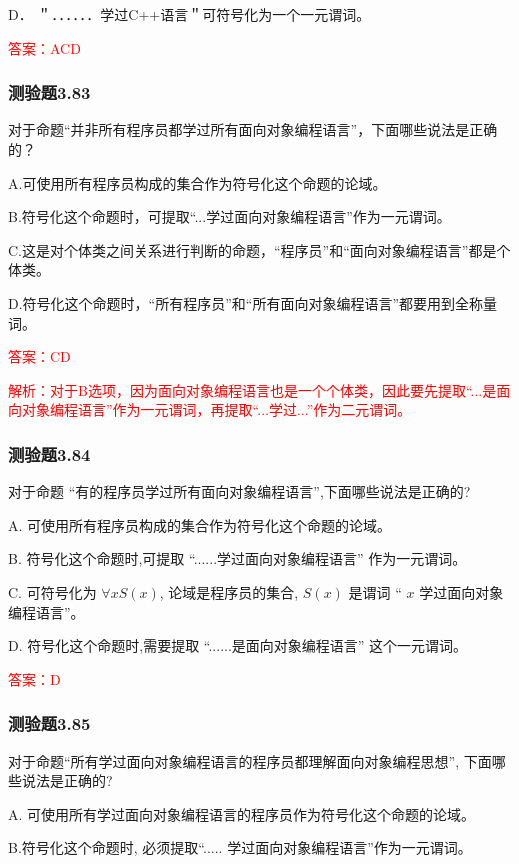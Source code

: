 \documentclass[UTF8, heading=true]{ctexart}
\begin{document}
D．
＂．．．．．．学过C++语言＂可符号化为一个一元谓词。

\textcolor{red}{答案：ACD}

\subsubsection{测验题3.83}

对于命题“并非所有程序员都学过所有面向对象编程语言”，下面哪些说法是正确的？

A.可使用所有程序员构成的集合作为符号化这个命题的论域。

B.符号化这个命题时，可提取“...学过面向对象编程语言”作为一元谓词。

C.这是对个体类之间关系进行判断的命题，“程序员”和“面向对象编程语言”都是个体类。

D.符号化这个命题时，“所有程序员”和“所有面向对象编程语言”都要用到全称量词。

\textcolor{red}{答案：CD}

\textcolor{red}{解析：对于B选项，因为面向对象编程语言也是一个个体类，因此要先提取“...是面向对象编程语言”作为一元谓词，再提取“...学过...”作为二元谓词。}

\subsubsection{测验题3.84}

对于命题 “有的程序员学过所有面向对象编程语言”,下面哪些说法是正确的?

A. 可使用所有程序员构成的集合作为符号化这个命题的论域。

B.  符号化这个命题时,可提取 “......学过面向对象编程语言” 作为一元谓词。

C.   可符号化为 $\forall x S(x)$, 论域是程序员的集合, $S(x)$ 是谓词 “ $x$ 学过面向对象编程语言”。

D. 符号化这个命题时,需要提取 “......是面向对象编程语言” 这个一元谓词。

\textcolor{red}{答案：D}

\subsubsection{测验题3.85}

对于命题“所有学过面向对象编程语言的程序员都理解面向对象编程思想”, 下面哪些说法是正确的?

A. 可使用所有学过面向对象编程语言的程序员作为符号化这个命题的论域。

B.符号化这个命题时, 必须提取“..... 学过面向对象编程语言”作为一元谓词。
\end{document}
